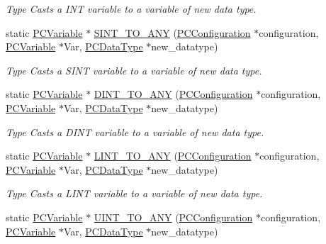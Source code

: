 \begin{DoxyCompactItemize}
\begin{DoxyCompactList}\small\item\em Type Casts a I\+NT variable to a variable of new data type. \end{DoxyCompactList}\item 
static \hyperlink{classpc__emulator_1_1PCVariable}{P\+C\+Variable} $\ast$ \hyperlink{classpc__emulator_1_1Utils_a10aa502b8a0c552082352559ce25757e}{S\+I\+N\+T\+\_\+\+T\+O\+\_\+\+A\+NY} (\hyperlink{classpc__emulator_1_1PCConfiguration}{P\+C\+Configuration} $\ast$configuration, \hyperlink{classpc__emulator_1_1PCVariable}{P\+C\+Variable} $\ast$Var, \hyperlink{classpc__emulator_1_1PCDataType}{P\+C\+Data\+Type} $\ast$new\+\_\+datatype)
\begin{DoxyCompactList}\small\item\em Type Casts a S\+I\+NT variable to a variable of new data type. \end{DoxyCompactList}\item 
static \hyperlink{classpc__emulator_1_1PCVariable}{P\+C\+Variable} $\ast$ \hyperlink{classpc__emulator_1_1Utils_a96479987c0814f65737e8eeffa8b0e61}{D\+I\+N\+T\+\_\+\+T\+O\+\_\+\+A\+NY} (\hyperlink{classpc__emulator_1_1PCConfiguration}{P\+C\+Configuration} $\ast$configuration, \hyperlink{classpc__emulator_1_1PCVariable}{P\+C\+Variable} $\ast$Var, \hyperlink{classpc__emulator_1_1PCDataType}{P\+C\+Data\+Type} $\ast$new\+\_\+datatype)
\begin{DoxyCompactList}\small\item\em Type Casts a D\+I\+NT variable to a variable of new data type. \end{DoxyCompactList}\item 
static \hyperlink{classpc__emulator_1_1PCVariable}{P\+C\+Variable} $\ast$ \hyperlink{classpc__emulator_1_1Utils_a9926717443d1adac415f6a8bf5c725f7}{L\+I\+N\+T\+\_\+\+T\+O\+\_\+\+A\+NY} (\hyperlink{classpc__emulator_1_1PCConfiguration}{P\+C\+Configuration} $\ast$configuration, \hyperlink{classpc__emulator_1_1PCVariable}{P\+C\+Variable} $\ast$Var, \hyperlink{classpc__emulator_1_1PCDataType}{P\+C\+Data\+Type} $\ast$new\+\_\+datatype)
\begin{DoxyCompactList}\small\item\em Type Casts a L\+I\+NT variable to a variable of new data type. \end{DoxyCompactList}\item 
static \hyperlink{classpc__emulator_1_1PCVariable}{P\+C\+Variable} $\ast$ \hyperlink{classpc__emulator_1_1Utils_a9369bc339eb63f43481ea2b6165a1522}{U\+I\+N\+T\+\_\+\+T\+O\+\_\+\+A\+NY} (\hyperlink{classpc__emulator_1_1PCConfiguration}{P\+C\+Configuration} $\ast$configuration, \hyperlink{classpc__emulator_1_1PCVariable}{P\+C\+Variable} $\ast$Var, \hyperlink{classpc__emulator_1_1PCDataType}{P\+C\+Data\+Type} $\ast$new\+\_\+datatype)

\end{DoxyCompactItemize}
